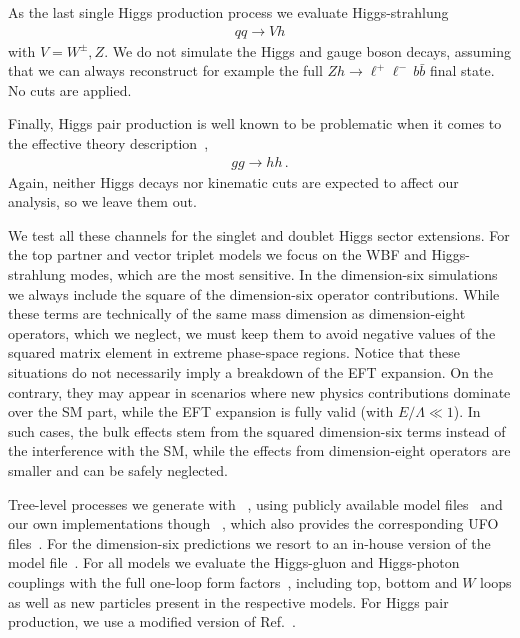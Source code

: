 As the last single Higgs production process we evaluate
Higgs-strahlung
%
\begin{align} q q \to V h
\end{align}
%
with $V = W^\pm, Z$. We do not simulate the Higgs and gauge boson
decays, assuming that we can always reconstruct for example the full
$Zh \to \ell^+ \ell^- \, b \bar{b}$ final state. No cuts are
applied.

Finally, Higgs pair production is well known to be problematic when it
comes to the effective theory description~\cite{hh-breakdown},
%
\begin{align} g g \to h h \,.
\end{align}
%
Again, neither Higgs decays nor kinematic cuts are expected to affect
our analysis, so we leave them out.

We test all these channels for the singlet and doublet Higgs sector
extensions. For the top partner and vector triplet models we focus on
the WBF and Higgs-strahlung modes, which are the most sensitive.  In
the dimension-six simulations we always include the square of the
dimension-six operator contributions. While these terms are technically
of the same mass dimension as dimension-eight operators, which we neglect,
we must keep them to avoid negative values of the squared matrix
element in extreme phase-space regions. Notice that these situations
do not necessarily imply a breakdown of the EFT expansion. On the
contrary, they may appear in scenarios where new physics contributions
dominate over the SM part, while the EFT expansion is fully valid
(with $E/\Lambda \ll 1$). In such cases, the bulk effects stem from
the squared dimension-six terms instead of the interference with the SM,
while the effects from dimension-eight operators are smaller and can be
safely neglected.  

Tree-level processes we generate with
~\cite{Alwall:2014hca}, using publicly available
model files~\cite{feynrules-site} and our own implementations though
~\cite{Alloul:2013bka}, which also provides the
corresponding UFO files~\cite{Degrande:2011ua}.  For the dimension-six
predictions we resort to an in-house version of the 
model file~\cite{Alloul:2013naa}.  For all models we evaluate the
Higgs-gluon and Higgs-photon couplings with the full one-loop form
factors~\cite{ggh-analytical}, including top, bottom and $W$ loops as
well as new particles present in the respective models. For Higgs pair
production, we use a modified version of Ref.~\cite{higgspair-ucl}.

